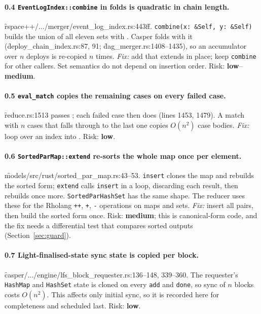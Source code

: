 \documentclass[11pt]{article}
\newcommand{\low}{\textcolor{lo}{\textbf{low}}}
\newcommand{\medium}{\textcolor{med}{\textbf{medium}}}
\begin{document}
\paragraph{0.4 \texttt{EventLogIndex::combine} in folds is quadratic in chain length.}
\f{rspace++/.../merger/event_log_index.rs}:443ff. \texttt{combine(x: \&Self, y: \&Self)}
builds the union of all eleven sets with . Casper folds
with it (\f{deploy_chain_index.rs}:87, 91; \f{dag_merger.rs}:1408--1435), so an accumulator over
$n$ deploys is re-copied $n$ times. \emph{Fix:} add  that
extends in place; keep \texttt{combine} for other callers. Set semantics do not depend on
insertion order. Risk: \low{}--\medium{}.

\paragraph{0.5 \texttt{eval\_match} copies the remaining cases on every failed case.}
\f{reduce.rs}:1513 passes ; each failed case then does
 (lines 1453, 1479). A match with $n$ cases that
falls through to the last one copies $O(n^2)$ case bodies. \emph{Fix:} loop over an index into
. Risk: \low{}.

\paragraph{0.6 \texttt{SortedParMap::extend} re-sorts the whole map once per element.}
\f{models/src/rust/sorted_par_map.rs}:43--53. \texttt{insert} clones the map and rebuilds the
sorted form; \texttt{extend} calls \texttt{insert} in a loop, discarding each result, then
rebuilds once more. \texttt{SortedParHashSet} has the same shape. The reducer uses these for the
Rholang \texttt{++}, \texttt{+}, \texttt{-} operations on maps and sets. \emph{Fix:} insert all
pairs, then build the sorted form once. Risk: \medium{}; this is canonical-form code, and the
fix needs a differential test that compares sorted outputs (Section~\ref{sec:guard}).

\paragraph{0.7 Light-finalised-state sync state is copied per block.}
\f{casper/.../engine/lfs_block_requester.rs}:136--148, 339--360. The requester's
\texttt{HashMap} and \texttt{HashSet} state is cloned on every \texttt{add} and \texttt{done},
so sync of $n$ blocks costs $O(n^2)$. This affects only initial sync, so it is recorded here for
completeness and scheduled last. Risk: \low{}.
\end{document}

